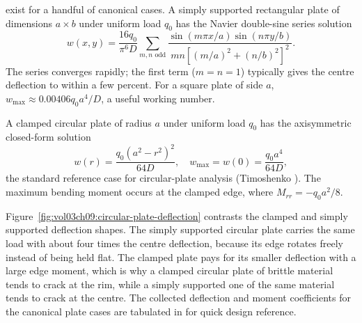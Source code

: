  exist for a handful of canonical
cases. A simply supported rectangular plate of dimensions $a \times
b$ under uniform load $q_0$ has the Navier double-sine series
solution
\[
w(x, y) = \frac{16 q_0}{\pi^6 D} \sum_{m, n \text{ odd}}
\frac{\sin(m\pi x/a) \sin(n\pi y/b)}{m n \left[(m/a)^2 + (n/b)^2
\right]^2}.
\]
The series converges rapidly; the first term ($m = n = 1$) typically
gives the centre deflection to within a few percent. For a square
plate of side $a$, $w_{\max} \approx 0.00406 q_0 a^4/D$, a useful
working number.

A clamped circular plate of radius $a$ under uniform load $q_0$ has
the axisymmetric closed-form solution
\[
w(r) = \frac{q_0 (a^2 - r^2)^2}{64 D}, \quad
w_{\max} = w(0) = \frac{q_0 a^4}{64 D},
\]
the standard reference case for circular-plate analysis (Timoshenko
\cite[ch.~3, eqn.~62]{text:timoshenko-plates-shells}). The
maximum bending moment occurs at the clamped edge, where
$M_{rr} = -q_0 a^2/8$.



Figure~\ref{fig:vol03ch09:circular-plate-deflection} contrasts the
clamped and simply supported deflection shapes. The simply supported
circular plate carries the same load with about four times the centre
deflection, because its edge rotates freely instead of being held flat.
The clamped plate pays for its smaller deflection with a large edge
moment, which is why a clamped circular plate of brittle material
tends to crack at the rim, while a simply supported one of the same
material tends to crack at the centre. The collected deflection and
moment coefficients for the canonical plate cases are tabulated in
 for quick design reference.

